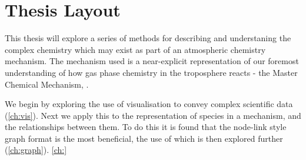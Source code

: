 \section{Thesis Layout}
This thesis will explore a series of methods for describing and understaning the complex chemistry which may exist as part of an atmospheric chemistry mechanism. The mechanism used is a near-explicit representation of our foremost understanding of how gas phase chemistry in the troposphere reacts - the Master Chemical Mechanism, \citep{mcm}.

We begin by exploring the use of visualisation to convey complex scientific data (\autoref{ch:vis}). Next we apply this to the representation of species in a mechanism, and the relationships between them. To do this it is found that the node-link style graph format is the most beneficial, the use of which is then explored further (\autoref{ch:graph}). \autoref{ch:}
